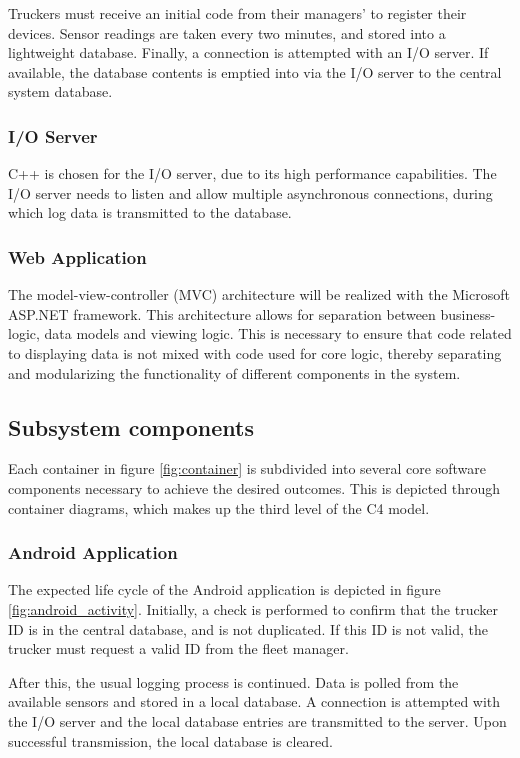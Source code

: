 Truckers must receive an initial code from their managers' to register their devices.
Sensor readings are taken every two minutes, and stored into a lightweight database.
Finally, a connection is attempted with an I/O server. If available, the database contents is emptied into via the I/O server to the central system database.

\subsubsection{I/O Server}
C++ is chosen for the I/O server, due to its high performance capabilities.
The I/O server needs to listen and allow multiple asynchronous connections, during which log data is transmitted to the database.

\subsubsection{Web Application}
The model-view-controller (MVC) architecture will be realized with the Microsoft ASP.NET framework.
This architecture allows for separation between business-logic, data models and viewing logic.
This is necessary to ensure that code related to displaying data is not mixed with code used for core logic, thereby separating and modularizing the functionality of different components in the system.

\subsection{Subsystem components}
Each container in figure \ref{fig:container} is subdivided into several core software components necessary to achieve the desired outcomes.
This is depicted through container diagrams, which makes up the third level of the C4 model.

\subsubsection{Android Application}
The expected life cycle of the Android application is depicted in figure \ref{fig:android_activity}.
Initially, a check is performed to confirm that the trucker ID is in the central database, and is not duplicated.
If this ID is not valid, the trucker must request a valid ID from the fleet manager.

After this, the usual logging process is continued.
Data is polled from the available sensors and stored in a local database.
A connection is attempted with the I/O server and the local database entries are transmitted to the server.
Upon successful transmission, the local database is cleared.


